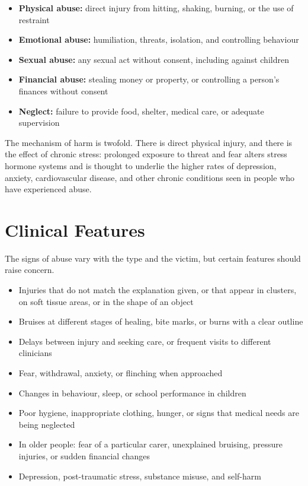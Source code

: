 \begin{itemize}
    \item \textbf{Physical abuse:} direct injury from hitting, shaking, burning, or the use of restraint
    \item \textbf{Emotional abuse:} humiliation, threats, isolation, and controlling behaviour
    \item \textbf{Sexual abuse:} any sexual act without consent, including against children
    \item \textbf{Financial abuse:} stealing money or property, or controlling a person's finances without consent
    \item \textbf{Neglect:} failure to provide food, shelter, medical care, or adequate supervision
\end{itemize}

The mechanism of harm is twofold. There is direct physical injury, and there is the effect of chronic stress: prolonged exposure to threat and fear alters stress hormone systems and is thought to underlie the higher rates of depression, anxiety, cardiovascular disease, and other chronic conditions seen in people who have experienced abuse.

\section*{Clinical Features}
The signs of abuse vary with the type and the victim, but certain features should raise concern.

\begin{itemize}
    \item Injuries that do not match the explanation given, or that appear in clusters, on soft tissue areas, or in the shape of an object
    \item Bruises at different stages of healing, bite marks, or burns with a clear outline
    \item Delays between injury and seeking care, or frequent visits to different clinicians
    \item Fear, withdrawal, anxiety, or flinching when approached
    \item Changes in behaviour, sleep, or school performance in children
    \item Poor hygiene, inappropriate clothing, hunger, or signs that medical needs are being neglected
    \item In older people: fear of a particular carer, unexplained bruising, pressure injuries, or sudden financial changes
    \item Depression, post-traumatic stress, substance misuse, and self-harm
\end{itemize}

